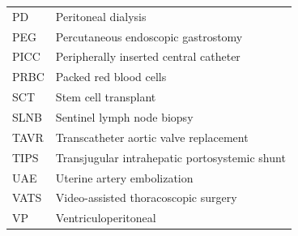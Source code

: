 \documentclass[12pt,oneside]{book}
\begin{document}
\begin{footnotesize}
\begin{longtable}{@{}ll@{}}
PD & Peritoneal dialysis \\
PEG & Percutaneous endoscopic gastrostomy \\
PICC & Peripherally inserted central catheter \\
PRBC & Packed red blood cells \\
SCT & Stem cell transplant \\
SLNB & Sentinel lymph node biopsy \\
TAVR & Transcatheter aortic valve replacement \\
TIPS & Transjugular intrahepatic portosystemic shunt \\
UAE & Uterine artery embolization \\
VATS & Video-assisted thoracoscopic surgery \\
VP & Ventriculoperitoneal \\
\bottomrule
\end{longtable}
\end{footnotesize}

\mainmatter
\end{document}
